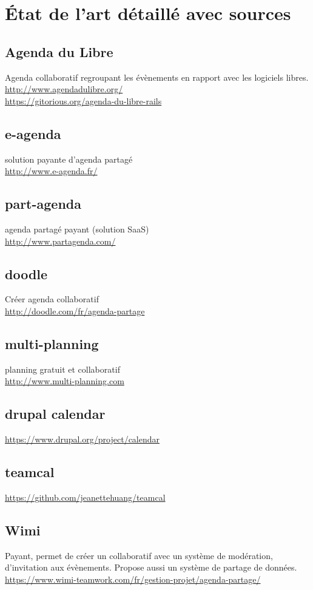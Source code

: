 \documentclass[a4paper,10pt]{article}
\begin{document}
\section{État de l'art détaillé avec sources}
\subsection*{Agenda du Libre}
Agenda collaboratif regroupant les évènements en rapport avec les logiciels libres.\\
\url{http://www.agendadulibre.org/}\\	
\url{https://gitorious.org/agenda-du-libre-rails}
\subsection*{e-agenda}
solution payante d'agenda partagé\\
\url{http://www.e-agenda.fr/}
\subsection*{part-agenda}
agenda partagé payant (solution SaaS)\\
\url{http://www.partagenda.com/}
\subsection*{doodle}
Créer agenda collaboratif\\
\url{http://doodle.com/fr/agenda-partage}
\subsection*{multi-planning}
planning gratuit et collaboratif\\
\url{http://www.multi-planning.com}
\subsection*{drupal calendar}
\url{https://www.drupal.org/project/calendar}
\subsection*{teamcal}
\url{https://github.com/jeanettehuang/teamcal}
\subsection*{Wimi}
Payant, permet de créer un collaboratif avec un système de modération, d'invitation aux évènements. Propose aussi un système de partage de données.\\
\url{https://www.wimi-teamwork.com/fr/gestion-projet/agenda-partage/}
\end{document}
